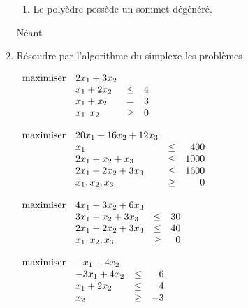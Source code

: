 \begin{enumerate}
\begin{enumerate}
      \item Le poly\`edre possède un sommet dégénéré.




    \end{enumerate}







    \begin{solution}
      Néant
    \end{solution}

  \item
    Résoudre par l'algorithme du simplexe les problèmes



    $
    \begin{array}{llcr}
      \mbox{maximiser} & 2x_1+3x_2\\
      & x_1+2x_2 & \leq & 4\\
      & x_1+x_2 & = & 3\\
      & x_1, x_2& \geq & 0
    \end{array}
    $



    $
    \begin{array}{llcr}
      \mbox{maximiser} & 20 x_1+16x_2+12 x_3\\
      & x_1  & \leq & 400\\
      &2x_1+x_2+x_3 & \leq & 1000\\
      &2x_1+2x_2+ 3x_3 & \leq & 1600\\
      & x_1, x_2, x_3 & \geq & 0
    \end{array}
    $



    $
    \begin{array}{llcr}
      \mbox{maximiser} & 4x_1+3x_2+6x_3\\
      & 3x_1+x_2+3x_3 & \leq & 30\\
      & 2x_1+2x_2+3x_3 & \leq & 40\\
      & x_1, x_2, x_3 & \geq & 0
    \end{array}
    $





    $
    \begin{array}{llcr}
      \mbox{maximiser} & -x_1+4x_2\\
      & -3x_1+4x_2 & \leq & 6\\
      & x_1+2x_2 & \leq & 4\\
      & x_2& \geq & -3
    \end{array}
    $









\end{enumerate}
